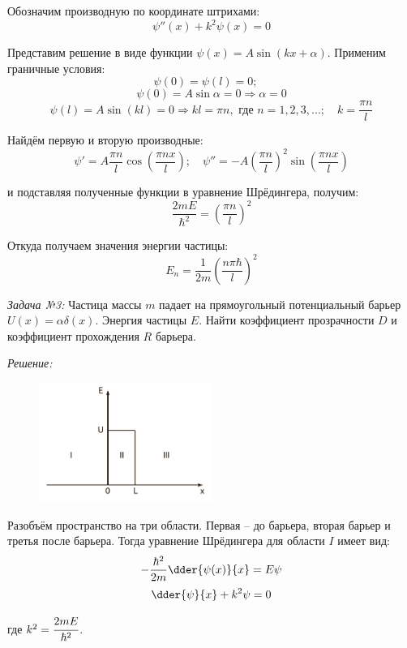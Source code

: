 Обозначим производную по координате штрихами:
\[
	\psi''(x) + k^2 \psi(x) = 0
\]

Представим решение в виде функции 
\( \psi(x) = A\sin\left( kx + \alpha \right) \). Применим 
граничные условия:
\[
	\psi(0) = \psi(l) = 0; \quad
\]
\[
	\psi(0) = A\sin\alpha = 0 \Rightarrow \alpha = 0
\]
\[
	\psi(l) = A\sin\left( kl \right) = 0 \Rightarrow kl = \pi n, 
	\text{ где } n = 1, 2, 3, ...; \quad k = \frac{\pi n}{l}
\]

Найдём первую и вторую производные:
\[
	\psi' = A\frac{\pi n}{l}\cos\left( \frac{\pi nx}{l} \right);\quad
	\psi'' = -A\left(\frac{\pi n}{l} \right)^2 
		\sin\left( \frac{\pi nx}{l} \right)
\]

и подставляя полученные функции в уравнение Шрёдингера, получим:
\[
	\frac{2mE}{\hbar^2} = \left( \frac{\pi n}{l} \right)^2
\]

Откуда получаем значения энергии частицы:
\[
	E_n = \frac{1}{2m}\left( \frac{n\pi\hbar}{l} \right)^2
\]

\pagebreak

\emph{Задача №3:} Частица массы \( m \) падает на прямоугольный потенциальный 
барьер \( U(x) = \alpha\delta(x) \). Энергия частицы \( E \). Найти коэффициент 
прозрачности \( D \) и коэффициент прохождения \( R \) барьера.

\emph{Решение:}

\begin{figure}
    \vspace{-2ex}
    \includegraphics[width=0.5\textwidth]{images/wall}
\end{figure}

Разобъём пространство на три области. Первая -- до барьера, вторая 
барьер и третья после барьера. Тогда уравнение Шрёдингера для 
области \( I \) имеет вид:
\[
	-\frac{\hbar^2}{2m}\dder{\psi(x)}{x} = E\psi
\]
\[
	\dder{\psi}{x} + k^2 \psi = 0
\]

где \( k^2 = \cfrac{2mE}{\hbar^2} \).

